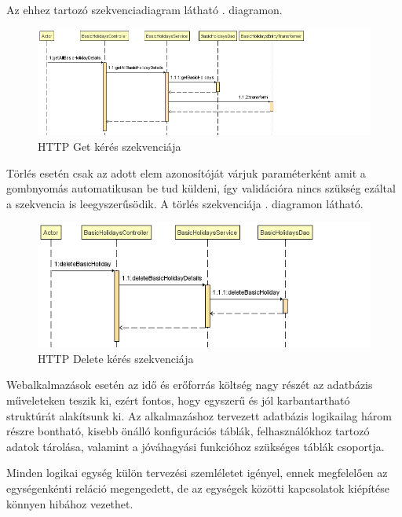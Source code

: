 Az ehhez tartozó szekvenciadiagram látható . diagramon. 
\begin{figure}[h]
	\centering
	\includegraphics[scale=0.3]{images/lekérdezőSzekvencia.png}
	\caption{HTTP Get kérés szekvenciája}
	\label{fig:lekerdezoSzekvencia}
\end{figure}

Törlés esetén csak az adott elem azonosítóját várjuk paraméterként amit a gombnyomás automatikusan be tud küldeni, így validációra nincs szükség ezáltal a szekvencia is leegyszerűsödik. A törlés szekvenciája . diagramon látható.

\begin{figure}[h]
	\centering
	\includegraphics[scale=0.3]{images/törlésiSzekvencia.png}
	\caption{HTTP Delete kérés szekvenciája}
	\label{fig:törlesiSzekvencia}
\end{figure}

Webalkalmazások esetén az idő és erőforrás költség nagy részét az adatbázis műveleteken teszik ki, ezért fontos, hogy egyszerű és jól karbantartható struktúrát alakítsunk ki.
\vskip 0.2in
Az alkalmazáshoz tervezett adatbázis logikailag három részre bontható, kisebb önálló konfigurációs táblák,  felhasználókhoz tartozó adatok tárolása, valamint a jóváhagyási funkcióhoz szükséges táblák csoportja.

Minden logikai egység külön tervezési szemléletet igényel, ennek megfelelően az egységenkénti reláció megengedett, de az egységek közötti kapcsolatok kiépítése könnyen hibához vezethet.

